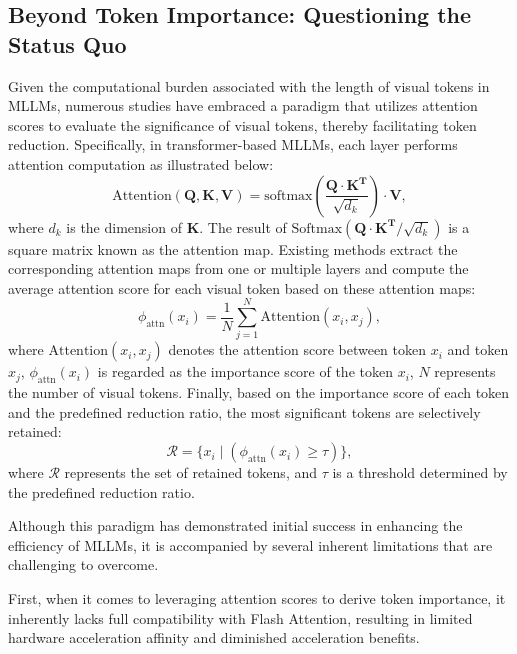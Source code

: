 \subsection{Beyond Token Importance: Questioning the Status Quo}
Given the computational burden associated with the length of visual tokens in MLLMs, numerous studies have embraced a paradigm that utilizes attention scores to evaluate the significance of visual tokens, thereby facilitating token reduction.
Specifically, in transformer-based MLLMs, each layer performs attention computation as illustrated below:
\begin{equation}
   \text{Attention}(\mathbf{Q}, \mathbf{K}, \mathbf{V}) = \text{softmax}\left(\frac{\mathbf{Q} \cdot \mathbf{K}^\mathbf{T}}{\sqrt{d_k}}\right)\cdot \mathbf{V},
\end{equation}
where $d_k$ is the dimension of $\mathbf{K}$. The result of $\text{Softmax}(\mathbf{Q}\cdot \mathbf{K}^\mathbf{T}/\sqrt{d_k})$ is a square matrix known as the attention map.
Existing methods extract the corresponding attention maps from one or multiple layers and compute the average attention score for each visual token based on these attention maps:
\begin{equation}
    \phi_{\text{attn}}(x_i) = \frac{1}{N} \sum_{j=1}^{N} \text{Attention}(x_i, x_j),
\end{equation}
where $\text{Attention}(x_i, x_j)$ denotes the attention score between token $x_i$ and token $x_j$, $\phi_{\text{attn}}(x_i)$ is regarded as the importance score of the token $x_i$, $N$ represents the number of visual tokens.
Finally, based on the importance score of each token and the predefined reduction ratio, the most significant tokens are selectively retained:
\begin{equation}
    \mathcal{R} = \{ x_i \mid (\phi_{\text{attn}}(x_i) \geq \tau) \},
\end{equation}
where $\mathcal{R}$ represents the set of retained tokens, and $\tau$ is a threshold determined by the predefined reduction ratio.

 Although this paradigm has demonstrated initial success in enhancing the efficiency of MLLMs, it is accompanied by several inherent limitations that are challenging to overcome.

First, when it comes to leveraging attention scores to derive token importance, it inherently lacks full compatibility with Flash Attention, resulting in limited hardware acceleration affinity and diminished acceleration benefits.

